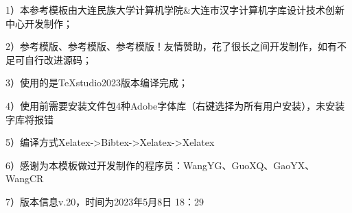 \documentclass{standalone}
\begin{document}
	
\begin{chineseabstract}

1）本参考模板由大连民族大学计算机学院\&大连市汉字计算机字库设计技术创新中心开发制作；

2）参考模版、参考模版、参考模版！友情赞助，花了很长之间开发制作，如有不足可自行改进源码；

3）使用的是TeXstudio2023版本编译完成；

4）使用前需要安装文件包4种Adobe字体库（右键选择为所有用户安装），未安装字库将报错

5）编译方式Xelatex->Bibtex->Xelatex->Xelatex

6）感谢为本模板做过开发制作的程序员：WangYG、GuoXQ、GaoYX、WangCR

7）版本信息v.20，时间为2023年5月8日 18：29





\end{chineseabstract}
\end{document}
